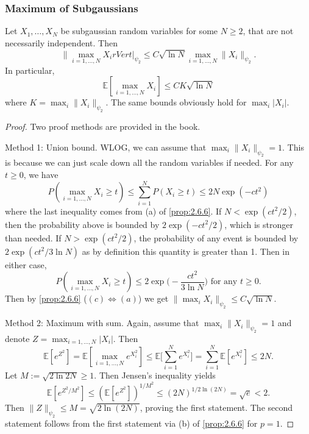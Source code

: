 \subsubsection{Maximum of Subgaussians}
\begin{proposition}
\label{prop:2.7.6}
Let $X_1, \dots, X_N$ be subgaussian random variables for some $N \geq 2$, that are not necessarily 
independent. Then 
\[ \lVert \max_{i = 1, \dots, N} X_i rVert|_{\psi_2} \leq C \sqrt{\ln{N}} 
\max_{i = 1, \dots, N} \lVert X_i \rVert_{\psi_2}. \]
In particular, 
\[ \mathbb{E}[\max_{i = 1, \dots, N} X_i] \leq CK \sqrt{\ln{N}} \]
where $K = \max_{i} \lVert X_i \rVert_{\psi_2}$. The same bounds obviously hold for $\max_{i}|X_i|$.
\end{proposition}

\begin{proof}
Two proof methods are provided in the book.

Method 1: Union bound. WLOG, we can assume that $\max_{i} \lVert X_i \rVert_{\psi_2} = 1$. 
This is because we can just scale down all the random variables if needed. For any $t \geq 0$, we have 
\[ P(\max_{i = 1, \dots, N} X_i \geq t) \leq \sum_{i = 1}^{N} P(X_i \geq t) \leq 2N \exp{(-ct^2)} \]
where the last inequality comes from (a) of \cref{prop:2.6.6}. If $N < \exp{(ct^2 / 2)}$, then the 
probability above is bounded by $2\exp{(-ct^2 / 2)}$, which is stronger than needed. If 
$N > \exp{(ct^2 / 2)}$, the probability of any event is bounded by $2\exp{(ct^2 / 3 \ln{N})}$ as by definition 
this quantity is greater than 1. Then in either case, 
\[  P(\max_{i = 1, \dots, N} X_i \geq t) \leq 2 \exp{\biggl( -\frac{ct^2}{3 \ln{N}} \biggr)} 
\text{ for any } t \geq 0. \]
Then by \cref{prop:2.6.6} ($(c) \iff (a)$) we get $\lVert \max_{i} X_i \rVert_{\psi_2} \leq C \sqrt{\ln{N}}.$

Method 2: Maximum with sum. Again, assume that $\max_{i} \lVert X_i \rVert_{\psi_2} = 1$ and denote 
$Z = \max_{i = 1, \dots, N} |X_i|$. Then 
\[ \mathbb{E}[e^{Z^2}] = \mathbb{E}[\max_{i = 1, \dots, N} e^{X_i^2}] 
\leq \mathbb{E}\biggl[ \sum_{i = 1}^{N} e^{X_i^2} \biggr] = \sum_{i = 1}^{N} \mathbb{E}[e^{X_i^2}] 
\leq 2N. \]
Let $M := \sqrt{2 \ln{2N}} \geq 1$. Then Jensen's inequality yields 
\[ \mathbb{E}[e^{Z^2 / M^2}] \leq (\mathbb{E}[e^{Z^2}])^{1 / M^2} 
\leq (2N)^{1 / 2 \ln{(2N)}} = \sqrt{e} < 2. \]
Then $\lVert Z \rVert_{\psi_2} \leq M = \sqrt{2 \ln{(2N)}}$, proving the first statement. 
The second statement follows from the first statement via (b) of \cref{prop:2.6.6} for $p = 1$.
\end{proof}

